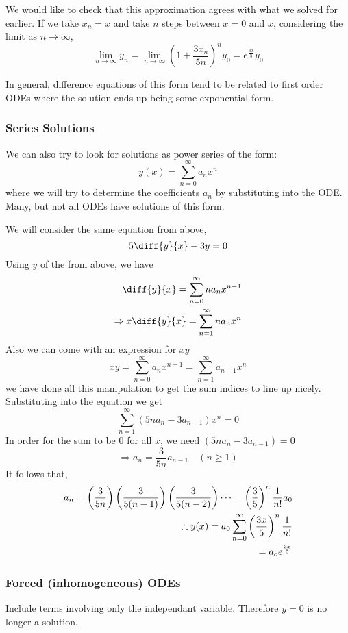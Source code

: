 \documentclass{article}
\begin{document}
We would like to check that this approximation agrees with what we solved for earlier. If we take $x_n = x$ and take $n$ steps between $x=0$ and $x$, considering the limit as $n \rightarrow \infty$,
\[
    \lim_{n \rightarrow \infty}y_n = \lim_{n \rightarrow \infty} (1 + \frac{3x_n}{5n})^ny_0 = e^{\frac{3x}{5}}y_0
\]

In general, difference equations of this form tend to be related to first order ODEs where the solution ends up being some exponential form.

\subsubsection*{Series Solutions}

We can also try to look for solutions as power series of the form:
\[
    y(x) = \sum_{n=0}^{\infty}{a_nx^n}    
\]
where we will try to determine the coefficients $a_n$ by substituting into the ODE. Many, but not all ODEs have solutions of this form.

We will consider the same equation from above,
\[
    5 \diff{y}{x} - 3y = 0
\]
Using $y$ of the from above, we have
\begin{align*}
    \diff{y}{x} = \sum_{n=0}^{\infty}{na_nx^{n-1}} \\
    \Rightarrow x\diff{y}{x} = \sum_{n=1}^{\infty}{na_nx^{n}}
\end{align*}
Also we can come with an expression for $xy$
\[
    xy = \sum_{n=0}^{\infty}{a_nx^{n+1}} = \sum_{n=1}^{\infty}{a_{n-1}x^{n}}
\]
we have done all this manipulation to get the sum indices to line up nicely. Substituting into the equation we get
\[
    \sum_{n=1}^{\infty}(5na_n - 3a_{n-1})x^n = 0
\]
In order for the sum to be $0$ for all $x$, we need $(5na_n - 3a_{n-1}) = 0$
\[
    \Rightarrow a_n = \frac{3}{5n}a_{n-1} \quad (n \geq 1)
\]
It follows that,
\begin{align*}
    a_n = \left( \frac{3}{5n} \right)\left( \frac{3}{5(n-1)} \right)\left( \frac{3}{5(n-2)} \right)\cdots = \left( \frac{3}{5} \right)^n\frac{1}{n!}a_0 \\
    \therefore y(x) = a_0 \sum_{n=0}^{\infty}\left( \frac{3x}{5} \right)^n\frac{1}{n!} \\
    = a_o e^\frac{3x}{5}
\end{align*}

\subsubsection{Forced (inhomogeneous) ODEs}
Include terms involving only the independant variable. Therefore $y = 0$ is no longer a solution.
\end{document}

